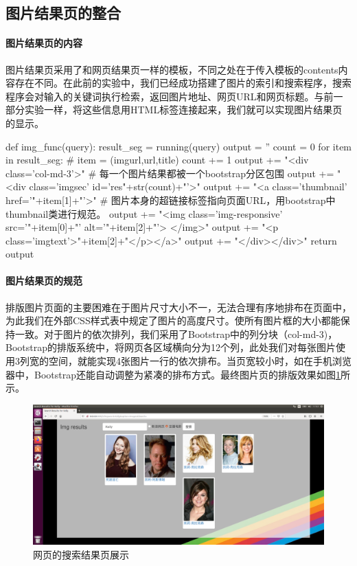 \documentclass{article}
\begin{document}
\subsection{图片结果页的整合}

\paragraph{图片结果页的内容} 图片结果页采用了和网页结果页一样的模板，不同之处在于传入模板的contents内容存在不同。在此前的实验中，我们已经成功搭建了图片的索引和搜索程序，搜索程序会对输入的关键词执行检索，返回图片地址、网页URL和网页标题。与前一部分实验一样，将这些信息用HTML标签连接起来，我们就可以实现图片结果页的显示。

\begin{python}
def img_func(query):
    result_seg = running(query)
    output = ''
    count = 0
    for item in result_seg:                      # item = (imgurl,url,title)
        count += 1
        output += "<div class='col-md-3'>"       # 每一个图片结果都被一个bootstrap分区包围
        output += "<div class='imgsec' id='res"+str(count)+"'>"
        output += "<a class='thumbnail' href='"+item[1]+"'>"          
                         # 图片本身的超链接标签指向页面URL，用bootstrap中thumbnail类进行规范。
        output += "<img class='img-responsive' src='"+item[0]+"' alt='"+item[2]+"'> </img>"
        output += "<p class='imgtext'>"+item[2]+"</p></a>"        
        output += "</div></div>"
    return output
\end{python}

\paragraph{图片结果页的规范} 排版图片页面的主要困难在于图片尺寸大小不一，无法合理有序地排布在页面中，为此我们在外部CSS样式表中规定了图片的高度尺寸。使所有图片框的大小都能保持一致。对于图片的依次排列，我们采用了Bootstrap中的列分块（col-md-3)，Bootstrap的排版系统中，将网页各区域横向分为12个列，此处我们对每张图片使用3列宽的空间，就能实现4张图片一行的依次排布。当页宽较小时，如在手机浏览器中，Bootstrap还能自动调整为紧凑的排布方式。最终图片页的排版效果如图\ref{fig:img}所示。

\begin{figure}[htbp]
\centering
\includegraphics[width=13.5cm]{img/img2.png}
\caption{网页的搜索结果页展示}
\label{fig:img}
\end{figure}
\end{document}
